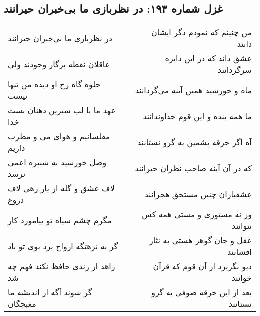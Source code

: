 \begin{center}
\section*{غزل شماره ۱۹۳: در نظربازی ما بی‌خبران حیرانند}
\label{sec:sh193}
\begin{longtable}{l p{0.5cm} r}
در نظربازی ما بی‌خبران حیرانند
&&
من چنینم که نمودم دگر ایشان دانند
\\
عاقلان نقطه پرگار وجودند ولی
&&
عشق داند که در این دایره سرگردانند
\\
جلوه گاه رخ او دیده من تنها نیست
&&
ماه و خورشید همین آینه می‌گردانند
\\
عهد ما با لب شیرین دهنان بست خدا
&&
ما همه بنده و این قوم خداوندانند
\\
مفلسانیم و هوای می و مطرب داریم
&&
آه اگر خرقه پشمین به گرو نستانند
\\
وصل خورشید به شبپره اعمی نرسد
&&
که در آن آینه صاحب نظران حیرانند
\\
لاف عشق و گله از یار زهی لاف دروغ
&&
عشقبازان چنین مستحق هجرانند
\\
مگرم چشم سیاه تو بیاموزد کار
&&
ور نه مستوری و مستی همه کس نتوانند
\\
گر به نزهتگه ارواح برد بوی تو باد
&&
عقل و جان گوهر هستی به نثار افشانند
\\
زاهد ار رندی حافظ نکند فهم چه شد
&&
دیو بگریزد از آن قوم که قرآن خوانند
\\
گر شوند آگه از اندیشه ما مغبچگان
&&
بعد از این خرقه صوفی به گرو نستانند
\\
\end{longtable}
\end{center}
